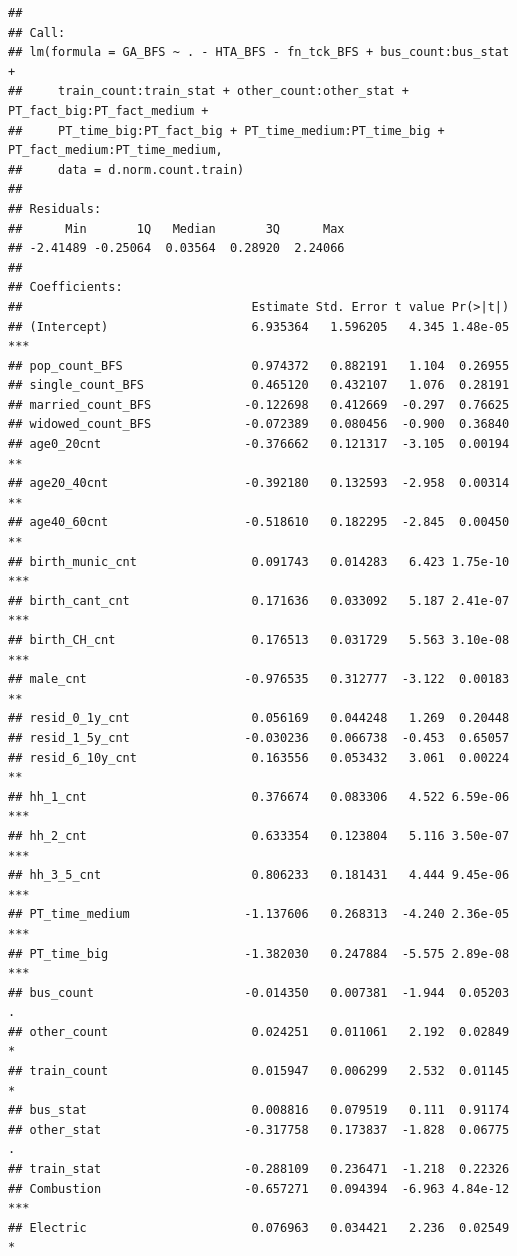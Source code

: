 \documentclass[
]{article}
\begin{document}
\begin{verbatim}
## 
## Call:
## lm(formula = GA_BFS ~ . - HTA_BFS - fn_tck_BFS + bus_count:bus_stat + 
##     train_count:train_stat + other_count:other_stat + PT_fact_big:PT_fact_medium + 
##     PT_time_big:PT_fact_big + PT_time_medium:PT_time_big + PT_fact_medium:PT_time_medium, 
##     data = d.norm.count.train)
## 
## Residuals:
##      Min       1Q   Median       3Q      Max 
## -2.41489 -0.25064  0.03564  0.28920  2.24066 
## 
## Coefficients:
##                                Estimate Std. Error t value Pr(>|t|)    
## (Intercept)                    6.935364   1.596205   4.345 1.48e-05 ***
## pop_count_BFS                  0.974372   0.882191   1.104  0.26955    
## single_count_BFS               0.465120   0.432107   1.076  0.28191    
## married_count_BFS             -0.122698   0.412669  -0.297  0.76625    
## widowed_count_BFS             -0.072389   0.080456  -0.900  0.36840    
## age0_20cnt                    -0.376662   0.121317  -3.105  0.00194 ** 
## age20_40cnt                   -0.392180   0.132593  -2.958  0.00314 ** 
## age40_60cnt                   -0.518610   0.182295  -2.845  0.00450 ** 
## birth_munic_cnt                0.091743   0.014283   6.423 1.75e-10 ***
## birth_cant_cnt                 0.171636   0.033092   5.187 2.41e-07 ***
## birth_CH_cnt                   0.176513   0.031729   5.563 3.10e-08 ***
## male_cnt                      -0.976535   0.312777  -3.122  0.00183 ** 
## resid_0_1y_cnt                 0.056169   0.044248   1.269  0.20448    
## resid_1_5y_cnt                -0.030236   0.066738  -0.453  0.65057    
## resid_6_10y_cnt                0.163556   0.053432   3.061  0.00224 ** 
## hh_1_cnt                       0.376674   0.083306   4.522 6.59e-06 ***
## hh_2_cnt                       0.633354   0.123804   5.116 3.50e-07 ***
## hh_3_5_cnt                     0.806233   0.181431   4.444 9.45e-06 ***
## PT_time_medium                -1.137606   0.268313  -4.240 2.36e-05 ***
## PT_time_big                   -1.382030   0.247884  -5.575 2.89e-08 ***
## bus_count                     -0.014350   0.007381  -1.944  0.05203 .  
## other_count                    0.024251   0.011061   2.192  0.02849 *  
## train_count                    0.015947   0.006299   2.532  0.01145 *  
## bus_stat                       0.008816   0.079519   0.111  0.91174    
## other_stat                    -0.317758   0.173837  -1.828  0.06775 .  
## train_stat                    -0.288109   0.236471  -1.218  0.22326    
## Combustion                    -0.657271   0.094394  -6.963 4.84e-12 ***
## Electric                       0.076963   0.034421   2.236  0.02549 *  

\end{verbatim}
\end{document}
